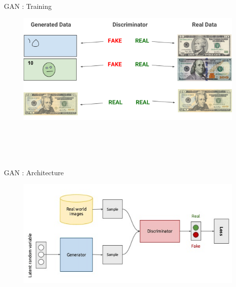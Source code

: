 \begin{frame}[fragile]{GAN : Training}
     \begin{figure}[ht]
         \hspace*{-1cm}\includegraphics[width=0.8\linewidth]{gantrain} \\ \\ \\ \\ \\ 


    \end{figure}
\end{frame}

\begin{frame}[fragile]{GAN : Architecture}
     \begin{figure}[ht]
         \hspace*{-1cm}\includegraphics[width=0.8\linewidth]{ganarchitecture.png} \\ \\ \\ \\ \\ 
    \end{figure}
\end{frame}
